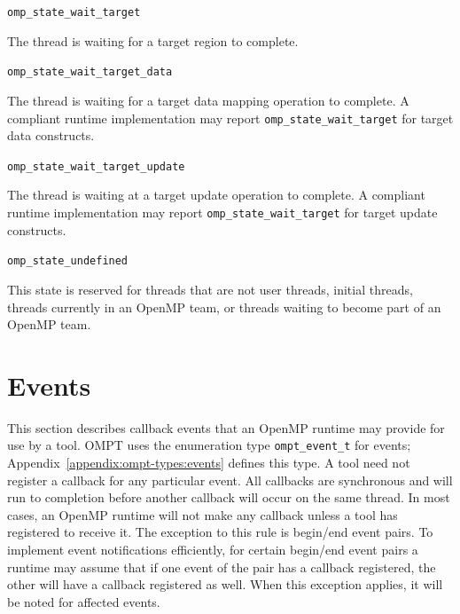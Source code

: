 \documentclass{article}
\newcommand{\descheader}[1]{{\needspace{3\baselineskip}\vspace{1em}\noindent \fbox{#1}}}
\begin{document}
\begin{description}

\item \verb|omp_state_wait_target| 

  The thread is waiting for a target region to complete.
  
\item \verb|omp_state_wait_target_data| 

  The thread is waiting for a target data mapping operation to complete. 
  A  compliant runtime implementation may report \verb|omp_state_wait_target| for target data constructs.

\item \verb|omp_state_wait_target_update| 

  The thread is waiting at a target  update operation to complete. 
  A  compliant runtime implementation may report \verb|omp_state_wait_target| for target update constructs.

\end{description}

\descheader{Undefined}

\begin{description}

\item \verb|omp_state_undefined| 

  This state is reserved for threads that are not user threads,
  initial threads, threads currently in an OpenMP team, or threads
  waiting to become part of an OpenMP team.

\end{description}

\section{Events}
\label{sec:events} 

This section describes callback events that an OpenMP runtime 
may provide for use by a tool. OMPT uses the enumeration type \verb|ompt_event_t| for events; 
Appendix~\ref{appendix:ompt-types:events} defines this type. 
A tool need not register a callback for any particular event.
All callbacks are synchronous and will run to completion before another callback will occur on the same thread.
In most cases, an OpenMP runtime will not make any callback unless a  tool has registered to receive it. The exception to this rule is begin/end event pairs. 
To implement event notifications efficiently, for certain begin/end event pairs a runtime may assume that if one event of the pair has a callback registered, the other will have a callback registered as well. When this exception applies, it will be noted for affected events.
\end{document}
